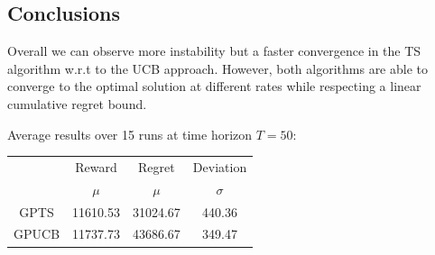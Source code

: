 
\subsection{Conclusions}

Overall we can observe more instability but a faster convergence in the TS algorithm w.r.t to the UCB approach.
However, both algorithms are able to converge to the optimal solution at different rates while respecting a linear cumulative regret bound.

Average results over 15 runs at time horizon $T = 50$:

\begin{table}[h]
	\center
	\begin{tabular}{|c|cc|c|}
	\hline \hline
		\cellcolor{blue!25} & Reward 	& Regret	& Deviation \\
	\cline{2-4}
		\cellcolor{blue!25} & $\mu$		& $\mu$		& $\sigma$	\\
	\hline \hline
		GPTS 				& 11610.53 	& 31024.67	& 440.36 	\\
	\hline
		GPUCB				& 11737.73	& 43686.67	& 349.47	\\
	\hline \hline
	\end{tabular}
\end{table}
